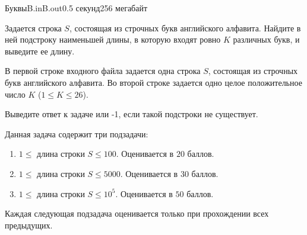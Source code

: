 \begin{problem}{Буквы}{B.in}{B.out}{0.5 секунд}{256 мегабайт}

Задается строка $S$, состоящая из строчных букв английского алфавита. Найдите в ней подстроку наименьшей длины, в которую входят ровно $K$ различных букв, и выведите ее длину.

\InputFile
В первой строке входного файла задается одна строка $S$, состоящая из строчных букв английского алфавита. Во второй строке задается одно целое положительное число $K$ ($ 1\le K \le 26$).

\OutputFile
Выведите ответ к задаче или -1, если такой подстроки не существует.

\Examples

\begin{example}
%
\end{example}


\Scoring
Данная задача содержит три подзадачи:
\begin{enumerate}
\item $1 \le$ длина строки $S \le 100$. Оценивается в $20$ баллов.
\item $1 \le$ длина строки $S \le 5000$. Оценивается в $30$ баллов.
\item $1 \le$ длина строки $S \le 10^5$. Оценивается в $50$ баллов.
\end{enumerate}

Каждая следующая подзадача оценивается только при прохождении всех предыдущих.

\end{problem}
